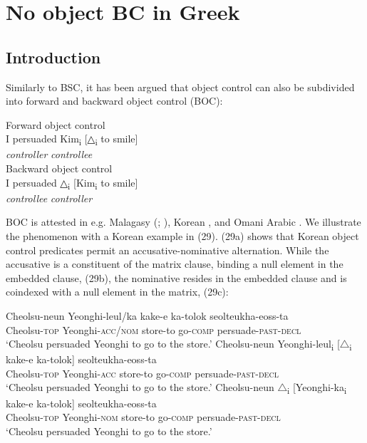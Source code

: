 \documentclass[output=paper]{langsci/langscibook}
\begin{document}
\section{No object BC in Greek} 

\subsection{Introduction}
Similarly to BSC, it has been argued that object control can also be subdivided into forward and backward object control (BOC):

\ea%
    \label{ex:alexiadou:33}
    \ea Forward object control\\
    \gll I persuaded   Kim\textsubscript{i}     [{△\textsubscript{i}} to smile]  \\
         {}   {}       \textit{controller}         \textit{controllee}\\
    \ex Backward object control\\
    \gll I persuaded  △\textsubscript{i}    [Kim\textsubscript{i}    to smile]  \\
        {}    {}       \textit{controllee}  \textit{controller}\\
        \z
\z

BOC is attested in e.g. Malagasy (\citealt{Potsdam2006Backward}; \citeyear{Potsdam2009}), Korean \citep{Monahan2003}, and Omani Arabic \citep{Al-Balushi2008}. We illustrate the phenomenon with a Korean example in (29). (29a) shows that Korean object control predicates permit an accusative-nominative alternation. While the accusative is a constituent of the matrix clause, binding a null element in the embedded clause, (29b), the nominative resides in the embedded clause and is coindexed with a null element in the matrix, (29c):
 
\ea%
    \label{ex:alexiadou:34}
    \ea\gll Cheolsu-neun  Yeonghi-leul/ka     kake-e    ka-tolok   seolteukha-eoss-ta\\
            Cheolsu-\textsc{top}     Yeonghi-\textsc{acc/nom}   store-to  go-\textsc{comp}   persuade-\textsc{past-decl}\\
    \glt    ‘Cheolsu persuaded Yeonghi to go to the store.’
    \ex
    \gll Cheolsu-neun Yeonghi-leul\textsubscript{i} [${\bigtriangleup}$\textsubscript{i} kake-e     ka-tolok]  seolteukha-eoss-ta\\
             Cheolsu-\textsc{top}    Yeonghi-\textsc{acc}    {}      store-to   go-\textsc{comp}   persuade-\textsc{past-decl}\\
    \glt     ‘Cheolsu persuaded Yeonghi to go to the store.’     
    \ex
    \gll Cheolsu-neun ${\bigtriangleup}$\textsubscript{i} [Yeonghi-ka\textsubscript{i}    kake-e    ka-tolok]  seolteukha-eoss-ta\\
             Cheolsu-\textsc{top}  {}       Yeonghi-\textsc{nom}    store-to  go-\textsc{comp}      persuade-\textsc{past-decl}\\
    \glt     ‘Cheolsu persuaded Yeonghi to go to the store.’ 
    \z
\z
\end{document}
